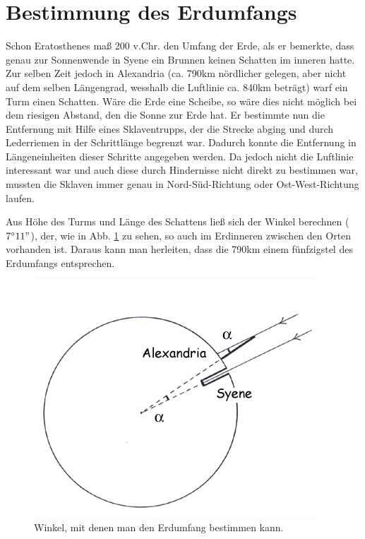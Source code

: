 \documentclass[12pt,a4paper,titlepage,headinclude,bibtotoc]{scrartcl}
\begin{document}
\section{Bestimmung des Erdumfangs}
Schon Eratosthenes maß 200 v.Chr. den Umfang der Erde, als er bemerkte, dass genau zur Sonnenwende in Syene ein Brunnen keinen Schatten im inneren hatte.
Zur selben Zeit jedoch in Alexandria (ca. 790km nördlicher gelegen, aber nicht auf dem selben Längengrad, wesshalb die Luftlinie ca. 840km beträgt) warf ein Turm einen Schatten.
Wäre die Erde eine Scheibe, so wäre dies nicht möglich bei dem riesigen Abstand, den die Sonne zur Erde hat.
Er bestimmte nun die Entfernung mit Hilfe eines Sklaventrupps, der die Strecke abging und durch Lederriemen in der Schrittlänge begrenzt war.
Dadurch konnte die Entfernung in Längeneinheiten dieser Schritte angegeben werden.
Da jedoch nicht die Luftlinie interessant war und auch diese durch Hindernisse nicht direkt zu bestimmen war, mussten die Sklaven immer genau in Nord-Süd-Richtung oder Ost-West-Richtung laufen.

Aus Höhe des Turms und Länge des Schattens ließ sich der Winkel berechnen ($7^\circ11"$), der, wie in Abb. \ref{fig:umfang} zu sehen, so auch im Erdinneren zwischen den Orten vorhanden ist.
Daraus kann man herleiten, dass die 790km einem fünfzigstel des Erdumfangs entsprechen.

\begin{figure}[h]
	\centering
	\includegraphics[width=0.37\linewidth]{Erdumfang}
	\caption{Winkel, mit denen man den Erdumfang bestimmen kann.\protect\footnotemark}
	\label{fig:umfang}
\end{figure}









\end{document}

